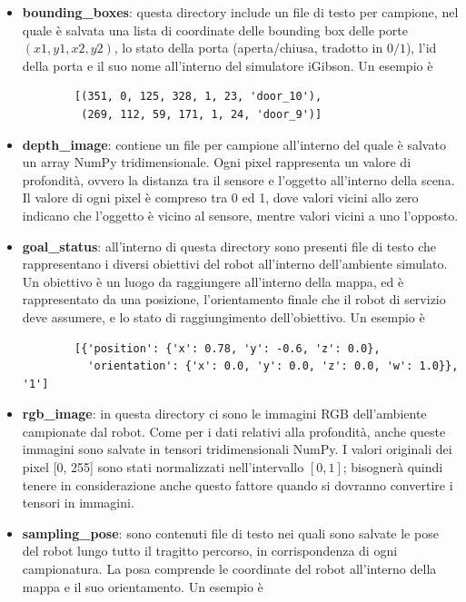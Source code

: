 \documentclass[12pt]{report}
\begin{document}
\begin{itemize}
	\item \textbf{bounding\_boxes}: questa directory include un file di testo per campione, nel quale è salvata una lista di coordinate delle bounding box delle porte $(x1, y1, x2, y2)$, lo stato della porta (aperta/chiusa, tradotto in $0/1$), l'id della porta e il suo nome all'interno del simulatore iGibson. Un esempio è
	
	\begin{verbatim}
		[(351, 0, 125, 328, 1, 23, 'door_10'),
		 (269, 112, 59, 171, 1, 24, 'door_9')]
	\end{verbatim}
	
	\item \textbf{depth\_image}: contiene un file per campione all'interno del quale è salvato un array NumPy tridimensionale. Ogni pixel rappresenta un valore di profondità, ovvero la distanza tra il sensore e l'oggetto all'interno della scena. Il valore di ogni pixel è compreso tra 0 ed 1, dove valori vicini allo zero indicano che l'oggetto è vicino al sensore, mentre valori vicini a uno l'opposto.
	
	\item \textbf{goal\_status}: all'interno di questa directory sono presenti file di testo che rappresentano i diversi obiettivi del robot all'interno dell'ambiente simulato. Un obiettivo è un luogo da raggiungere all'interno della mappa, ed è rappresentato da una posizione, l'orientamento finale che il robot di servizio deve assumere, e lo stato di raggiungimento dell'obiettivo. Un esempio è
	
	\begin{verbatim}
		[{'position': {'x': 0.78, 'y': -0.6, 'z': 0.0},
		  'orientation': {'x': 0.0, 'y': 0.0, 'z': 0.0, 'w': 1.0}}, '1']
	\end{verbatim}
	
	\item \textbf{rgb\_image}: in questa directory ci sono le immagini RGB dell'ambiente campionate dal robot. Come per i dati relativi alla profondità, anche queste immagini sono salvate in tensori tridimensionali NumPy. I valori originali dei pixel [0, 255] sono stati normalizzati nell'intervallo $[0, 1]$; bisognerà quindi tenere in considerazione anche questo fattore quando si dovranno convertire i tensori in immagini.
	
	\item \textbf{sampling\_pose}: sono contenuti file di testo nei quali sono salvate le pose del robot lungo tutto il tragitto percorso, in corrispondenza di ogni campionatura. La posa comprende le coordinate del robot all'interno della mappa e il suo orientamento. Un esempio è
	

\end{itemize}
\end{document}
